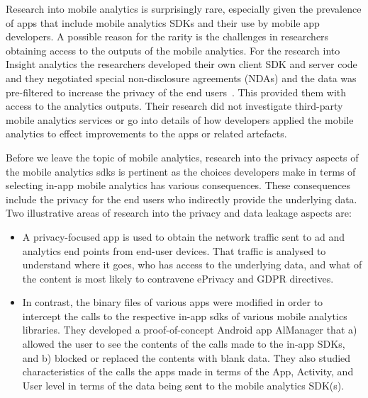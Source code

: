 Research into mobile analytics is surprisingly rare, especially given the prevalence of apps that include mobile analytics SDKs and their use by mobile app developers. A possible reason for the rarity is the challenges in researchers obtaining access to the outputs of the mobile analytics. For the research into Insight analytics the researchers developed their own client SDK and server code and they negotiated special non-disclosure agreements (NDAs) and the data was pre-filtered to increase the privacy of the end users~. This provided them with access to the analytics outputs. Their research did not investigate third-party mobile analytics services or go into details of how developers applied the mobile analytics to effect improvements to the apps or related artefacts.

Before we leave the topic of mobile analytics, research into the privacy aspects of the mobile analytics \Glspl{sdk} is pertinent as the choices developers make in terms of selecting in-app mobile analytics has various consequences. These consequences include the privacy for the end users who indirectly provide the underlying data. Two illustrative areas of research into the privacy and data leakage aspects are:

\begin{itemize}
        \item A privacy-focused app is used to obtain the network traffic sent to ad and analytics end points from end-user devices. That traffic is analysed to understand where it goes, who has access to the underlying data, and what of the content is most likely to contravene ePrivacy and GDPR directives\cite{razaghpanah2018_apps_trackers_privacy_and_regulators_a_global_study_of_the_mobile_tracking_ecosystem}.
        \item In contrast, the binary files of various apps were modified in order to intercept the calls to the respective in-app \Glspl{sdk} of various mobile analytics libraries. They developed a proof-of-concept Android app AlManager that a) allowed the user to see the contents of the calls made to the in-app SDKs, and b) blocked or replaced the contents with blank data. They also studied characteristics of the calls the apps made in terms of the App, Activity, and User level in terms of the data being sent to the mobile analytics SDK(s)\cite{liu2020_privacy_risk_analysis_and_mitigation_of_analytics_libraries_in_the_android_ecosystem}.
\end{itemize}

